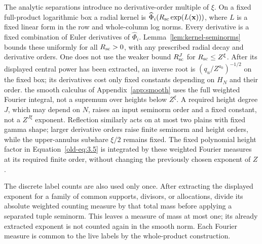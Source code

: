 \documentclass[12pt]{article}
\begin{document}
The analytic separations introduce no derivative-order multiple of
\(\xi\).  On a fixed full-product logarithmic box a radial kernel is
\(\widehat\Phi_i(R_{\rm sc}\exp(L(\mathbf x)))\), where \(L\) is a fixed
linear form in the row and whole-column log norms.  Every derivative
is a fixed combination of Euler derivatives of \(\widehat\Phi_i\).
Lemma~\ref{lem:kernel-seminorms} bounds these uniformly for all
\(R_{\rm sc}>0\), with any prescribed radial decay and derivative orders.
One does not use the weaker bound \(R_{\rm sc}^J\) for
\(R_{\rm sc}\le Z^\xi\).
After its displayed central power has been extracted, an inverse root
is \((q_u/Z^{a_0})^{-1/2}\) on the fixed box; its derivatives cost
only fixed constants depending on \(H_N\) and their order.
the smooth calculus of Appendix~\ref{app:smooth} uses the full weighted Fourier
integral, not a supremum over heights below \(Z^\xi\).  A required
height degree \(J\), which may depend on \(N\), raises an input
seminorm order and a fixed constant, not a \(Z^{J\xi}\) exponent.
Reflection similarly acts on at most two plains with fixed gamma
shape; larger derivative orders raise finite seminorm and height
orders, while the upper-annulus subshare \(\xi/2\) remains fixed.
The fixed polynomial height factor in Equation~\eqref{old-eq:3.5}
is integrated by these weighted Fourier measures at its required finite
order, without changing the previously chosen exponent of \(Z\).

The discrete label counts are also used only once.  After extracting
the displayed exponent for a family of common supports, divisors, or
allocations, divide its absolute weighted counting measure by that
total mass before applying a separated tuple seminorm.  This leaves a
measure of mass at most one; its already extracted exponent is not
counted again in the smooth norm.  Each Fourier measure is common to
the live labels by the whole-product construction.
\end{document}
